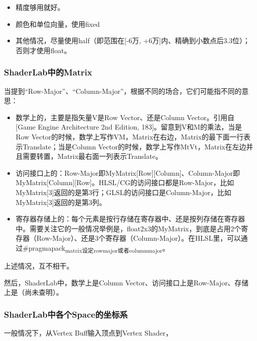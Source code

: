 \documentclass[9pt, b5paper]{article}
\begin{document}
\begin{itemize}
\item 精度够用就好。
\item 颜色和单位向量，使用fixed
\item 其他情况，尽量使用half（即范围在[-6万, +6万]内、精确到小数点后3.3位）；否则才使用float。
\end{itemize}
\subsubsection{ShaderLab中的Matrix}
\label{sec:orgb82cd44}

当提到“Row-Major”、“Column-Major”，根据不同的场合，它们可能指不同的意思：

\begin{itemize}
\item 数学上的，主要是指矢量V是Row Vector、还是Column Vector。引用自[Game Engine Architecture 2nd Edition, 183]。留意到V和M的乘法，当是Row Vector的时候，数学上写作VM，Matrix在右边，Matrix的最下面一行表示Translate；当是Column Vector的时候，数学上写作MtVt，Matrix在左边并且需要转置，Matrix最右面一列表示Translate。
\item 访问接口上的：Row-Major即MyMatrix[Row][Column]、Column-Major即MyMatrix[Column][Row]。HLSL/CG的访问接口都是Row-Major，比如MyMatrix[3]返回的是第3行；GLSL的访问接口是Column-Major，比如MyMatrix[3]返回的是第3列。
\item 寄存器存储上的：每个元素是按行存储在寄存器中、还是按列存储在寄存器中。需要关注它的一般情况举例是，float2x3的MyMatrix，到底是占用2个寄存器（Row-Major）、还是3个寄存器（Column-Major）。在HLSL里，可以通过\#pragmapack\textsubscript{matrix设定row}\textsubscript{major或者column}\textsubscript{major}。
\end{itemize}

上述情况，互不相干。

然后，ShaderLab中，数学上是Column Vector、访问接口上是Row-Major、存储上是（尚未查明）。

\subsubsection{ShaderLab中各个Space的坐标系}
\label{sec:org5fdd735}

一般情况下，从Vertex Buff输入顶点到Vertex Shader，
\end{document}
